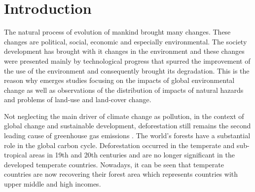 
\chapter*{Introduction}  %

\ifpdf
    \graphicspath{{Introduction/Figs/}{Introduction/}}
\else
    \graphicspath{{Introduction/Figs/}{Introduction/}}
\fi

The natural process of evolution of mankind brought many changes. These changes are political, social, economic and especially environmental. The society development has brought with it changes in the environment and these changes were presented mainly by technological progress that spurred the improvement of the use of the environment and consequently brought its degradation. This is the reason why emerges studies focusing on the impacts of global environmental change as well as observations of the distribution of impacts of natural hazards and problems of land-use and land-cover change. 

Not neglecting the main driver of climate change as pollution, in the context of global change and sustainable development, deforestation still remains the second leading cause of greenhouse gas emissions \citep{culas11}. The world’s forests have a substantial role in the global carbon cycle. %
Deforestation occurred in the temperate and sub-tropical areas in 19th and 20th centuries and are no longer significant in the developed temperate countries. Nowadays, it can be seen that temperate countries are now recovering their forest area which represents countries with upper middle and high incomes.

